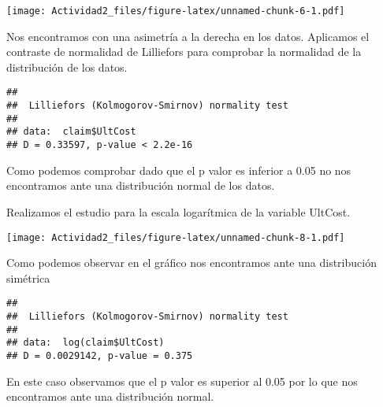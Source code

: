 \documentclass[
  a4paper]{article}
\newenvironment{Shaded}{\begin{snugshade}}{\end{snugshade}}
\newcommand{\AttributeTok}[1]{\textcolor[rgb]{0.77,0.63,0.00}{#1}}
\newcommand{\FunctionTok}[1]{\textcolor[rgb]{0.00,0.00,0.00}{#1}}
\newcommand{\NormalTok}[1]{#1}
\newcommand{\SpecialCharTok}[1]{\textcolor[rgb]{0.00,0.00,0.00}{#1}}
\newcommand{\StringTok}[1]{\textcolor[rgb]{0.31,0.60,0.02}{#1}}
\begin{document}
\texttt{[image: Actividad2\_files/figure-latex/unnamed-chunk-6-1.pdf]}

Nos encontramos con una asimetría a la derecha en los datos. Aplicamos
el contraste de normalidad de Lilliefors para comprobar la normalidad de
la distribución de los datos.

\begin{Shaded}
\end{Shaded}

\begin{verbatim}
## 
##  Lilliefors (Kolmogorov-Smirnov) normality test
## 
## data:  claim$UltCost
## D = 0.33597, p-value < 2.2e-16
\end{verbatim}

Como podemos comprobar dado que el p valor es inferior a 0.05 no nos
encontramos ante una distribución normal de los datos.

Realizamos el estudio para la escala logarítmica de la variable UltCost.

\begin{Shaded}
\end{Shaded}

\texttt{[image: Actividad2\_files/figure-latex/unnamed-chunk-8-1.pdf]}

Como podemos observar en el gráfico nos encontramos ante una
distribución simétrica

\begin{Shaded}
\end{Shaded}

\begin{verbatim}
## 
##  Lilliefors (Kolmogorov-Smirnov) normality test
## 
## data:  log(claim$UltCost)
## D = 0.0029142, p-value = 0.375
\end{verbatim}

En este caso observamos que el p valor es superior al 0.05 por lo que
nos encontramos ante una distribución normal.
\end{document}
